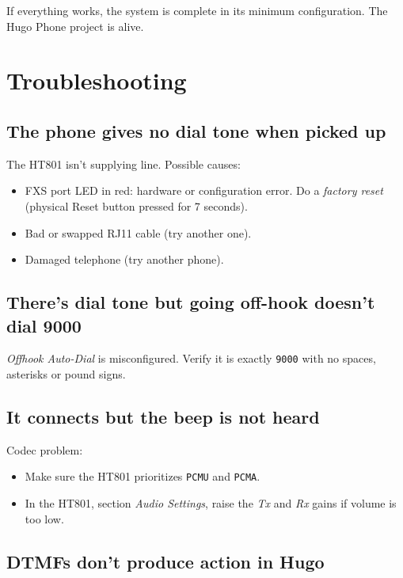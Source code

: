 If everything works, the system is complete in its minimum configuration. The Hugo Phone project is alive.

\section{Troubleshooting}

\subsection{The phone gives no dial tone when picked up}

The HT801 isn't supplying line. Possible causes:

\begin{itemize}
  \item FXS port LED in red: hardware or configuration error. Do a \emph{factory reset} (physical Reset button pressed for 7 seconds).
  \item Bad or swapped RJ11 cable (try another one).
  \item Damaged telephone (try another phone).
\end{itemize}

\subsection{There's dial tone but going off-hook doesn't dial 9000}

\emph{Offhook Auto-Dial} is misconfigured. Verify it is exactly \texttt{9000} with no spaces, asterisks or pound signs.

\subsection{It connects but the beep is not heard}

Codec problem:

\begin{itemize}
  \item Make sure the HT801 prioritizes \texttt{PCMU} and \texttt{PCMA}.
  \item In the HT801, section \emph{Audio Settings}, raise the \emph{Tx} and \emph{Rx} gains if volume is too low.
\end{itemize}

\subsection{DTMFs don't produce action in Hugo}


